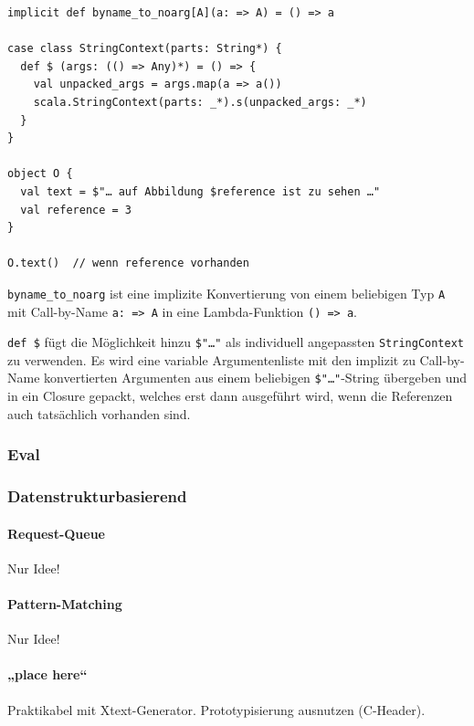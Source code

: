 \begin{lstlisting}
implicit def byname_to_noarg[A](a: => A) = () => a

case class StringContext(parts: String*) {
  def $ (args: (() => Any)*) = () => {
    val unpacked_args = args.map(a => a())
    scala.StringContext(parts: _*).s(unpacked_args: _*)
  }
}

object O {
  val text = $"… auf Abbildung $reference ist zu sehen …"
  val reference = 3
}

O.text()  // wenn reference vorhanden
\end{lstlisting}

\lstinline|byname_to_noarg| ist eine implizite Konvertierung von einem
beliebigen Typ \lstinline|A| mit Call-by-Name
\lstinline|a: => A| in eine Lambda-Funktion \lstinline|() => a|.

\lstinline|def $| fügt die Möglichkeit hinzu \lstinline|$"…"| als individuell angepassten \lstinline|StringContext| zu verwenden. Es wird eine variable 
Argumentenliste mit den implizit zu Call-by-Name konvertierten Argumenten
aus einem beliebigen \lstinline|$"…"|-String übergeben und in ein Closure gepackt,
welches erst dann ausgeführt wird, wenn die Referenzen auch tatsächlich
vorhanden sind.




\subsubsection{Eval}\label{sec-eval}

\subsubsection{Datenstrukturbasierend}\label{sec-datenstrukturbasierend}

\paragraph{Request-Queue}

Nur Idee!

\paragraph{Pattern-Matching}

Nur Idee!

\paragraph{„place here“}

Praktikabel mit Xtext-Generator. Prototypisierung ausnutzen (C-Header).
